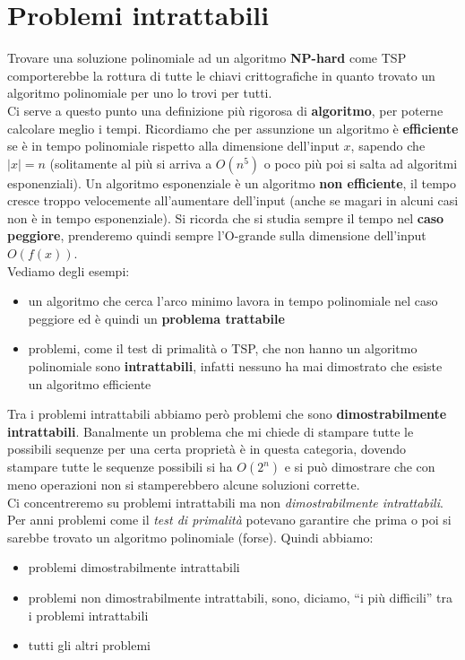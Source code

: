 \documentclass[a4paper,12pt, oneside]{book}
\begin{document}
\section{Problemi intrattabili}
Trovare una soluzione polinomiale ad un algoritmo \textbf{NP-hard} come TSP
comporterebbe la rottura di tutte le chiavi crittografiche in quanto trovato un
algoritmo polinomiale per uno lo trovi per tutti.\\
Ci serve a questo punto una definizione più rigorosa di \textbf{algoritmo}, per
poterne calcolare meglio i tempi. Ricordiamo che per assunzione un algoritmo è
\textbf{efficiente} se è in tempo polinomiale rispetto alla dimensione
dell'input $x$, sapendo che $|x|=n$ (solitamente al più si arriva a $O(n^5)$ o
poco più poi si salta ad algoritmi esponenziali). Un algoritmo esponenziale è un
algoritmo \textbf{non efficiente}, il tempo cresce troppo velocemente
all'aumentare dell'input (anche se magari in alcuni casi non è in tempo
esponenziale). Si ricorda che si studia sempre il tempo nel 
\textbf{caso peggiore}, prenderemo quindi sempre l'O-grande sulla dimensione
dell'input $O(f(x))$.\\
Vediamo degli esempi:
\begin{itemize}
  \item un algoritmo che cerca l'arco minimo lavora in tempo polinomiale nel
  caso peggiore ed è quindi un \textbf{problema trattabile}
  \item problemi, come il test di primalità o TSP, che non hanno un algoritmo
  polinomiale sono \textbf{intrattabili}, infatti nessuno ha mai dimostrato che
  esiste un algoritmo efficiente
\end{itemize}
Tra i problemi intrattabili abbiamo però problemi che sono
\textbf{dimostrabilmente intrattabili}. Banalmente un problema che mi chiede di
stampare tutte le possibili sequenze per una certa proprietà è in questa
categoria, dovendo stampare tutte le sequenze possibili si ha $O(2^n)$ e si può
dimostrare che con meno operazioni non si stamperebbero alcune soluzioni
corrette.\\
Ci concentreremo su problemi intrattabili ma non \textit{dimostrabilmente
  intrattabili}.\\
Per anni problemi come il \textit{test di primalità} potevano garantire che
prima o poi si sarebbe trovato un algoritmo polinomiale (forse). Quindi abbiamo:
\begin{itemize}
  \item problemi dimostrabilmente intrattabili
  \item problemi non dimostrabilmente intrattabili, sono, diciamo, ``i più
  difficili'' tra i problemi intrattabili
  \item tutti gli altri problemi
\end{itemize}
\end{document}
